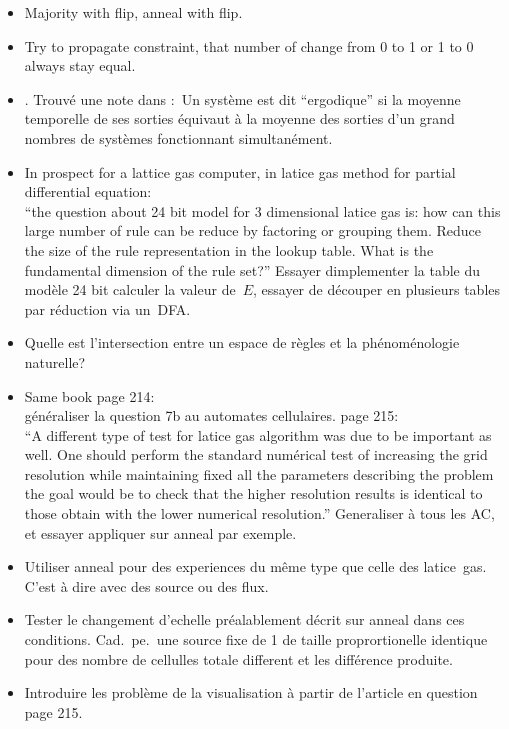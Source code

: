 \begin{itemize}
\item Majority with flip, anneal with flip.

\item Try to propagate constraint, that number of change from 0 to 1
  or 1 to 0 always stay equal.

\item {}. %
  Trouv\'e une note dans \cite{Queau89}:~Un syst\`eme est dit ``ergodique''
  si la moyenne temporelle de ses sorties \'equivaut \`a la moyenne des
  sorties d'un grand nombres de syst\`emes fonctionnant simultan\'ement.

\item In prospect for a lattice gas computer, in latice gas method for
  partial differential equation:\\
  ``the question about 24 bit model for 3 dimensional latice gas is: how
  can this large number of rule can be reduce by factoring or grouping
  them. %
  Reduce the size of the rule representation in the lookup table. %
  What is the fundamental dimension
  of the rule set?''
  Essayer dimplementer la table du mod\`ele 24 bit calculer la valeur
  de~$E$, essayer de d\'ecouper en plusieurs tables par r\'eduction via
  un~DFA.

\item Quelle est l'intersection entre un espace de r\`egles et la
  ph\'enom\'enologie naturelle?

\item Same book page 214:\\
  g\'en\'eraliser la question 7b au automates cellulaires.
  page 215:\\
  ``A different type of test for latice gas algorithm was due to be
  important as well. %
  One should perform the standard num\'erical test of increasing the grid
  resolution while maintaining fixed all the parameters describing the
  problem the goal would be to check that the higher resolution results
  is identical to those obtain with the lower
  numerical resolution.''
  Generaliser \`a tous les AC, et essayer appliquer sur anneal par
  exemple.

\item Utiliser anneal pour des experiences du m\^eme type que celle des
  latice~gas. %
  C'est \`a dire avec des source ou des flux.
  
\item Tester le changement d'echelle pr\'ealablement d\'ecrit sur anneal dans
  ces conditions. %
  Cad.\ pe.\ une source fixe de 1 de taille proprortionelle identique
  pour des nombre de cellulles totale different et les diff\'erence
  produite.

\item Introduire les probl\`eme de la visualisation \`a partir de l'article en
  question page 215.

\end{itemize}

